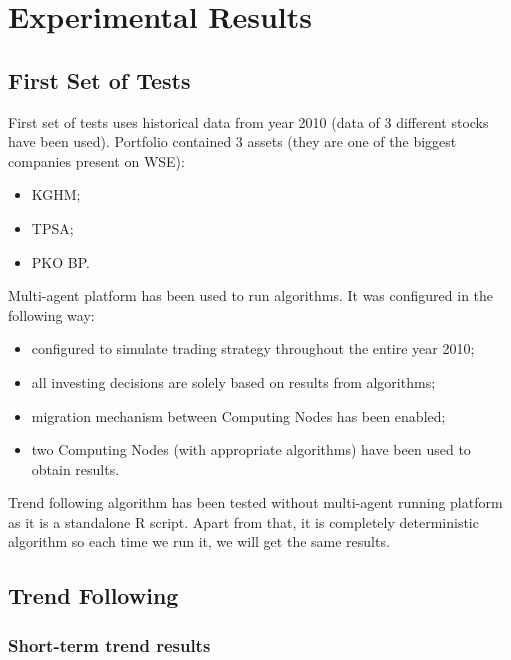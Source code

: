 
\section{Experimental Results}
\label{sec:experiments}

\subsection{First Set of Tests}
\label{sec:first_set_of_tests}

First set of tests uses historical data from year 2010 (data of 3 different stocks have been used). 
Portfolio contained 3 assets (they are one of the biggest companies present on WSE):

\begin{itemize} 
  \item KGHM;
  \item TPSA;
  \item PKO BP.
\end{itemize}

Multi-agent platform has been used to run algorithms.
It was configured in the following way: 

\begin{itemize}
  \item configured to simulate trading strategy throughout the entire year 2010;
  \item all investing decisions are solely based on results from algorithms;
  \item migration mechanism between Computing Nodes has been enabled;
  \item two Computing Nodes (with appropriate algorithms) have been used to obtain results.
\end{itemize}

Trend following algorithm has been tested without multi-agent running platform as it is a standalone R script.
Apart from that, it is completely deterministic algorithm so each time we run it, we will get the same results.

\subsection{Trend Following}

\subsubsection{Short-term trend results}
\label{short-term}

